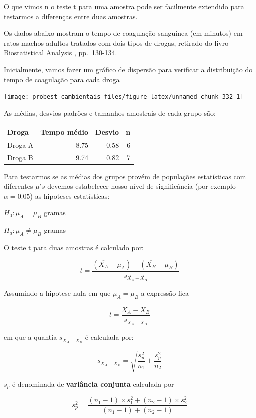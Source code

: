 \documentclass[
]{book}
\begin{document}
O que vimos n o teste t para uma amostra pode ser facilmente extendido para testarmos a diferenças entre duas amostras.

Os dados abaixo mostram o tempo de coagulação sanguínea (em minutos) em ratos machos adultos tratados com dois tipos de drogas, retirado do livro Biostatistical Analysis \citep{zar2010biostatistical}, pp.~130-134.

Inicialmente, vamos fazer um gráfico de dispersão para verificar a distribuição do tempo de coagulação para cada droga

\begin{center}\texttt{[image: probest-cambientais\_files/figure-latex/unnamed-chunk-332-1]} \end{center}

As médias, desvios padrões e tamanhos amostrais de cada grupo são:

\begin{tabular}{l|r|r|r}
\hline
Droga & Tempo médio & Desvio & n\\
\hline
Droga A & 8.75 & 0.58 & 6\\
\hline
Droga B & 9.74 & 0.82 & 7\\
\hline
\end{tabular}

Para testarmos se as médias dos grupos provém de populações estatísticas com diferentes \(\mu's\) devemos estabelecer nosso nível de significância (por exemplo \(\alpha = 0.05\)) as hipoteses estatísticas:

\(H_0: \mu_A = \mu_B\) gramas

\(H_a: \mu_A \ne \mu_B\) gramas

O teste t para duas amostras é calculado por:

\[t = \frac{(\overline{X_A} - \mu_A) - (\overline{X_B} - \mu_B)}{s_{\overline{X_A}-\overline{X_B}}}\]

Assumindo a hipotese nula em que \(\mu_A = \mu_B\) a expressão fica

\[t = \frac{\overline{X_A} - \overline{X_B}}{s_{\overline{X_A}-\overline{X_B}}}\]

em que a quantia \(s_{\overline{X_A}-\overline{X_B}}\) é calculada por:

\[s_{\overline{X_A}-\overline{X_B}} = \sqrt{\frac{s^2_{p}}{n_1} + \frac{s^2_{p}}{n_2}}\]

\(s_p\) é denominada de \textbf{variância conjunta} calculada por

\[s^2_p = \frac{(n_1 - 1) \times s^2_1 + (n_2 - 1) \times s^2_2}{(n_1 - 1) + (n_2 - 1)}\]
\end{document}
